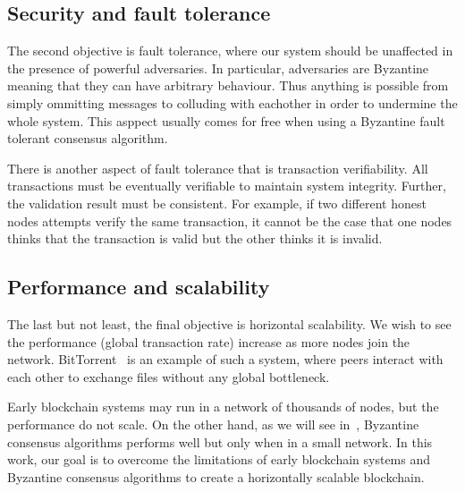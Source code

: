 
\subsection{Security and fault tolerance}

The second objective is fault tolerance,
where our system should be unaffected in the presence of powerful adversaries.
In particular, adversaries are Byzantine meaning that they can have arbitrary behaviour.
Thus anything is possible from simply ommitting messages to colluding with eachother in order to undermine the whole system.
This asppect usually comes for free when using a Byzantine fault tolerant consensus algorithm.

There is another aspect of fault tolerance that is transaction verifiability.
All transactions must be eventually verifiable to maintain system integrity.
Further, the validation result must be consistent.
For example, if two different honest nodes attempts verify the same transaction,
it cannot be the case that one nodes thinks that the transaction is valid but the other thinks it is invalid.


\subsection{Performance and scalability}

The last but not least, the final objective is horizontal scalability.
We wish to see the performance (global transaction rate) increase as more nodes join the network.
BitTorrent~\cite{cohen2003incentives} is an example of such a system,
where peers interact with each other to exchange files without any global bottleneck.

Early blockchain systems may run in a network of thousands of nodes, but the performance do not scale.
On the other hand, as we will see in~, Byzantine consensus algorithms performs well but only when in a small network.
In this work, our goal is to overcome the limitations of early blockchain systems and Byzantine consensus algorithms to create a horizontally scalable blockchain.

